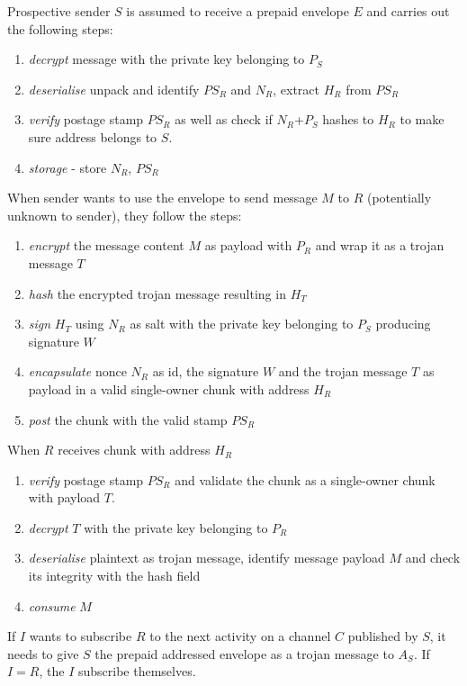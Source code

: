 Prospective sender $S$ is assumed to receive a prepaid envelope $E$ and carries out  the following steps:
\begin{enumerate}
    \item \emph{decrypt} message with the private key belonging to $P_S$
    \item \emph{deserialise} unpack and identify $PS_R$ and $N_R$, extract $H_R$ from $PS_R$
    \item \emph{verify} postage stamp $PS_R$ as well as check if $N_R$+$P_S$ hashes to $H_R$ to make sure address belongs to  $S$.
    \item \emph{storage} - store $N_R$, $PS_R$ 
\end{enumerate}

When sender wants to use the envelope to send message $M$ to $R$ (potentially unknown to sender), they 
follow the steps:

\begin{enumerate}
        \item \emph{encrypt} the message content $M$ as payload with $P_R$ and wrap it as a trojan message $T$
        \item \emph{hash} the encrypted trojan message resulting in $H_T$
        \item \emph{sign} $H_T$ using $N_R$ as salt with the private key belonging to $P_S$ producing signature $W$
        \item \emph{encapsulate} nonce $N_R$ as id, the signature $W$ and the trojan message $T$ as payload in a valid single-owner chunk with address $H_R$
        \item \emph{post} the chunk with the valid stamp $PS_R$
\end{enumerate}

When $R$ receives chunk with address $H_R$

\begin{enumerate}
    \item \emph{verify} postage stamp $PS_R$ and validate the chunk as a single-owner chunk with payload $T$.
    \item \emph{decrypt} $T$ with the private key belonging to $P_R$
    \item \emph{deserialise} plaintext as trojan message, identify message payload $M$ and check its integrity with the hash field
    \item \emph{consume} $M$
\end{enumerate}

If $I$ wants to subscribe $R$ to the next activity on a channel $C$ published by $S$, it needs to give $S$ the prepaid addressed envelope as a trojan message to $A_S$.
If $I=R$, the $I$ subscribe themselves.

